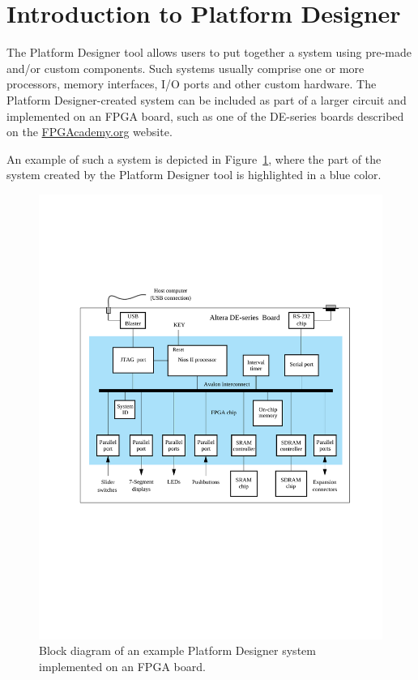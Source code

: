 \documentclass[11pt, twoside, pdftex]{article}
\begin{document}
\section{Introduction to Platform Designer}

The Platform Designer tool allows users to put together a system using pre-made and/or custom components. 
Such systems usually comprise one or more processors, memory interfaces, I/O ports and 
other custom hardware.  The Platform Designer-created system can be included as part of a 
larger circuit and implemented on an FPGA board, such as one of the DE-series boards
described on the
{\small \href{https://www.fpgacademy.org/boards.html} {FPGAcademy.org}} website.

An example of such a system is depicted in Figure~\ref{fig:1}, where the part of the
system created by the Platform Designer tool is highlighted in a blue color.

\begin{figure}[h!]
   \begin{center}
        \includegraphics[width=6.5in]{figures/fig1.pdf}
   \end{center}
   \caption{Block diagram of an example Platform Designer system implemented on an FPGA board.}
	\label{fig:1}
\end{figure}
\end{document}
